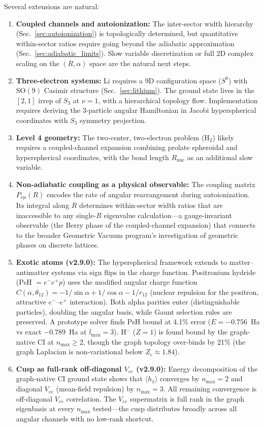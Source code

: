 \documentclass[aps,pra,twocolumn,superscriptaddress,longbibliography]{revtex4-2}
\begin{document}
Several extensions are natural:
\begin{enumerate}
  \item \textbf{Coupled channels and autoionization:} The
    inter-sector width hierarchy (Sec.~\ref{sec:autoionization})
    is topologically determined, but quantitative within-sector
    ratios require going beyond the adiabatic approximation
    (Sec.~\ref{sec:adiabatic_limits}).  Slow variable discretization
    or full 2D complex scaling on the $(R, \alpha)$ space are the
    natural next steps.
  \item \textbf{Three-electron systems:} Li requires a 9D
    configuration space ($S^8$) with $\mathrm{SO}(9)$ Casimir
    structure (Sec.~\ref{sec:lithium}).  The ground state
    lives in the $[2,1]$ irrep of $S_3$ at $\nu = 1$, with a
    hierarchical topology flow.  Implementation requires deriving
    the 3-particle angular Hamiltonian in Jacobi hyperspherical
    coordinates with $S_3$ symmetry projection.
  \item \textbf{Level 4 geometry:} The two-center, two-electron
    problem (H$_2$) likely requires a coupled-channel expansion
    combining prolate spheroidal and hyperspherical coordinates, with
    the bond length $R_{\mathrm{nuc}}$ as an additional slow variable.
  \item \textbf{Non-adiabatic coupling as a physical observable:}
    The coupling matrix $P_{\nu\mu}(R)$ encodes the rate of angular
    rearrangement during autoionization.  Its integral along $R$
    determines within-sector width ratios that are inaccessible to
    any single-$R$ eigenvalue calculation---a gauge-invariant
    observable (the Berry phase of the coupled-channel expansion)
    that connects to the broader Geometric Vacuum program's
    investigation of geometric phases on discrete lattices.
  \item \textbf{Exotic atoms (v2.9.0):} The hyperspherical framework
    extends to matter--antimatter systems via sign flips in the charge
    function.  Positronium hydride (PsH $= e^- e^+ p$) uses the
    modified angular charge function
    $C(\alpha, \theta_{12}) = -1/\sin\alpha + 1/\cos\alpha - 1/r_{12}$
    (nuclear repulsion for the positron, attractive $e^-$--$e^+$
    interaction).  Both alpha parities enter (distinguishable particles),
    doubling the angular basis, while Gaunt selection rules are
    preserved.  A prototype solver finds PsH bound at 4.1\% error
    ($E = -0.756$~Ha vs exact $-0.789$~Ha at $l_{\max}=3$).
    H$^-$ ($Z=1$) is found bound by the graph-native CI at $n_{\max}
    \ge 2$, though the graph topology over-binds by 21\% (the graph
    Laplacian is non-variational below $Z_c \approx 1.84$).
  \item \textbf{Cusp as full-rank off-diagonal $V_{ee}$ (v2.9.0):}
    Energy decomposition of the graph-native CI ground state shows that
    $\langle h_1 \rangle$ converges by $n_{\max}=2$ and diagonal $V_{ee}$
    (mean-field repulsion) by $n_{\max}=3$.  All remaining convergence
    is off-diagonal $V_{ee}$ correlation.  The $V_{ee}$ supermatrix is
    full rank in the graph eigenbasis at every $n_{\max}$ tested---the
    cusp distributes broadly across all angular channels with no
    low-rank shortcut.
\end{enumerate}
\end{document}
